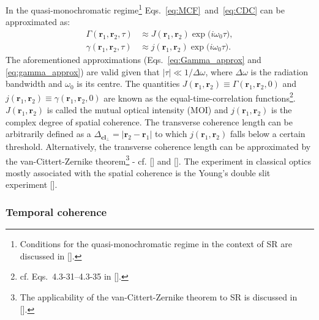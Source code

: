 \begin{refsection}
In the quasi-monochromatic regime\footnote{Conditions for the quasi-monochromatic regime in the context of SR are discussed in [\cite[\textit{§2.3}]{Geloni2008}].} Eqs.~\ref{eq:MCF}~and~\ref{eq:CDC} can be approximated as:
\begin{align}
    \Gamma(\textbf{r}_1,\textbf{r}_2,\tau) &\approx J(\textbf{r}_1,\textbf{r}_2)\exp{\big(i\omega_0 \tau\big)},\label{eq:Gamma_approx}\\
    \gamma(\textbf{r}_1,\textbf{r}_2,\tau) &\approx j(\textbf{r}_1,\textbf{r}_2)\exp{\big(i\omega_0 \tau\big)}.\label{eq:gamma_approx}
\end{align}{}
The aforementioned approximations (Eqs.~\ref{eq:Gamma_approx} and \ref{eq:gamma_approx}) are valid given that $|\tau|\ll 1/\Delta\omega$, where $\Delta \omega$ is the radiation bandwidth and $\omega_0$ is its centre. The quantities $J(\textbf{r}_1,\textbf{r}_2)\equiv\Gamma(\textbf{r}_1,\textbf{r}_2,0)$ and $j(\textbf{r}_1,\textbf{r}_2)\equiv\gamma(\textbf{r}_1,\textbf{r}_2,0)$ are known as the equal-time-correlation functions\footnote{cf. Eqs.~4.3-31--4.3-35 in [\cite{Mandel1995}].}. $J(\textbf{r}_1,\textbf{r}_2)$ is called the mutual optical intensity (MOI) and $j(\textbf{r}_1,\textbf{r}_2)$ is the complex degree of spatial coherence. The transverse coherence length can be arbitrarily defined as a $\Delta_{\textbf{cl}_\perp}=|\textbf{r}_2-\textbf{r}_1|$ to which $j(\textbf{r}_1,\textbf{r}_2)$ falls below a certain threshold. Alternatively, the transverse coherence length can be approximated by the van-Cittert-Zernike theorem\footnote{The applicability of the van-Cittert-Zernike theorem to SR is discussed in [\cite[\textit{§4}]{Geloni2008}].} - cf. [\cite[\textit{§4.4.4}]{Mandel1995}] and [\cite[\textit{§11.3.C}]{Saleh2019}]. The experiment in classical optics mostly associated with the spatial coherence is the Young's double slit experiment [\cite[\textit{§5.2.1}]{Goodman2015}].

\subsubsection*{Temporal coherence}


\end{refsection}
